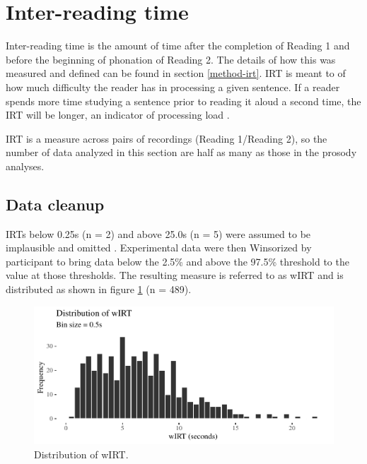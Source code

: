 \documentclass[12pt,oneside]{book}
\begin{document}
\hypertarget{irt}{%
\section{Inter-reading time}\label{irt}}

Inter-reading time is the amount of time after the completion of Reading 1 and before the beginning of phonation of Reading 2. The details of how this was measured and defined can be found in section \ref{method-irt}. IRT is meant to  of how much difficulty the reader has in processing a given sentence. If a reader spends more time studying a sentence prior to reading it aloud a second time, the IRT will be longer,  an indicator of processing load .

 IRT is a measure across pairs of recordings (Reading 1/Reading 2), so the number of data analyzed in this section are half as many as those in the prosody analyses.

\hypertarget{irtDis}{%
\subsection{Data cleanup}\label{irtDis}}

IRTs below 0.25s (n = 2) and above 25.0s (n = 5) were assumed to be implausible and omitted . Experimental data were then Winsorized by participant to bring data below the 2.5\% and above the 97.5\% threshold to the value at those thresholds. The resulting measure is referred to as wIRT and is distributed as shown in figure \ref{fig:wIRT} (n = 489).

\begin{figure}
\centering
\includegraphics{4-results_files/figure-latex/wIRT-1.pdf}
\caption{\label{fig:wIRT}Distribution of wIRT.}
\end{figure}
\end{document}
